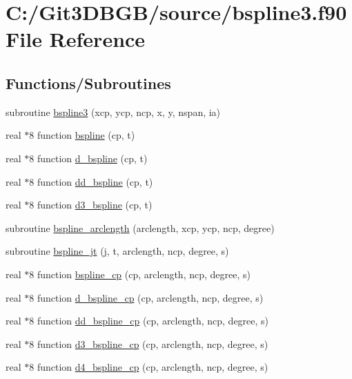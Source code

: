\hypertarget{bspline3_8f90}{}\section{C\+:/\+Git3\+D\+B\+G\+B/source/bspline3.f90 File Reference}
\label{bspline3_8f90}
\subsection*{Functions/\+Subroutines}
\begin{DoxyCompactItemize}
\item 
subroutine \hyperlink{bspline3_8f90_a92250bb4e8b3cc6a081d56e982d5bfd7}{bspline3} (xcp, ycp, ncp, x, y, nspan, ia)
\item 
real $\ast$8 function \hyperlink{bspline3_8f90_a876b80c737790ddcd8cd93e9cf0c3d90}{bspline} (cp, t)
\item 
real $\ast$8 function \hyperlink{bspline3_8f90_a0a37f176ebc11541781e38f68f4d1a3e}{d\+\_\+bspline} (cp, t)
\item 
real $\ast$8 function \hyperlink{bspline3_8f90_a799109ca306b9e7ba96828dfb26a7608}{dd\+\_\+bspline} (cp, t)
\item 
real $\ast$8 function \hyperlink{bspline3_8f90_a0a51c311a84359ce64857be35fd49e26}{d3\+\_\+bspline} (cp, t)
\item 
subroutine \hyperlink{bspline3_8f90_a68f8db1f5c1e4f4e0784106fd195b1c0}{bspline\+\_\+arclength} (arclength, xcp, ycp, ncp, degree)
\item 
subroutine \hyperlink{bspline3_8f90_a4039b2d4eb7420c4db088018084c788e}{bspline\+\_\+jt} (j, t, arclength, ncp, degree, s)
\item 
real $\ast$8 function \hyperlink{bspline3_8f90_ad4747234d29e2a5f5b03a0093d9892cf}{bspline\+\_\+cp} (cp, arclength, ncp, degree, s)
\item 
real $\ast$8 function \hyperlink{bspline3_8f90_a8b69f577b0915d1c813ec5ef9f1d83e2}{d\+\_\+bspline\+\_\+cp} (cp, arclength, ncp, degree, s)
\item 
real $\ast$8 function \hyperlink{bspline3_8f90_aa631f1850271138144a5d22fc3399862}{dd\+\_\+bspline\+\_\+cp} (cp, arclength, ncp, degree, s)
\item 
real $\ast$8 function \hyperlink{bspline3_8f90_a4d0df1205efee4866b9e3c35eee96933}{d3\+\_\+bspline\+\_\+cp} (cp, arclength, ncp, degree, s)
\item 
real $\ast$8 function \hyperlink{bspline3_8f90_a30559a73ceea14913f355464954bb790}{d4\+\_\+bspline\+\_\+cp} (cp, arclength, ncp, degree, s)

\end{DoxyCompactItemize}
